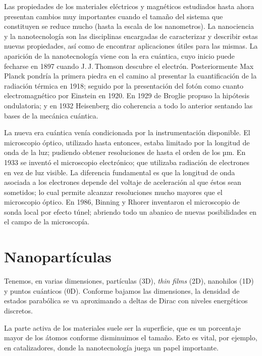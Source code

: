 \documentclass{tufte-book}
\begin{document}
Las propiedades de los materiales eléctricos y magnéticos estudiados
hasta ahora presentan cambios muy importantes cuando el tamaño del
sistema que constituyen se reduce mucho (hasta la escala de los
nanometros). La nanociencia y la nanotecnología son las disciplinas
encargadas de caracterizar y describir estas nuevas propiedades, así
como de encontrar aplicaciones útiles para las mismas. La aparición de
la nanotecnología viene con la era cuántica, cuyo inicio puede
fecharse en 1897 cuando J.\,J.\,Thomson descubre el electrón.
Posteriormente Max Planck pondría la primera piedra en el camino al
presentar la cuantificación de la radiación térmica en 1918; seguido
por la presentación del fotón como cuanto electromagnético por
Einstein en 1920. En 1929 de Broglie propuso la hipótesis ondulatoria;
y en 1932 Heisenberg dio coherencia a todo lo anterior sentando las
bases de la mecánica cuántica.

La nueva era cuántica venía condicionada por la instrumentación
disponible. El microscopio óptico, utilizado hasta entonces, estaba
limitado por la longitud de onda de la luz; pudiendo obtener
resoluciones de hasta el orden de los µm. En 1933 se inventó el
microscopio electrónico; que utilizaba radiación de electrones en vez
de luz visible. La diferencia fundamental es que la longitud de onda
asociada a los electrones depende del voltaje de aceleración al que
éstos sean sometidos; lo cual permite alcanzar resoluciones mucho
mayores que el microscopio óptico. En 1986, Binning y Rhorer
inventaron el microscopio de sonda local por efecto túnel; abriendo
todo un abanico de nuevas posibilidades en el campo de la microscopía.

\section{Nanopartículas}

Tenemos, en varias dimensiones, partículas (3D), \textit{thin films}
(2D), nanohilos (1D) y puntos cuánticos (0D). Conforme bajamos las
dimensiones, la densidad de estados parabólica se va aproximando a
deltas de Dirac con niveles energéticos discretos.

La parte activa de los materiales suele ser la superficie, que es un
porcentaje mayor de los átomos conforme disminuimos el tamaño. Esto es
vital, por ejemplo, en catalizadores, donde la nanotecnología juega un
papel importante.
\end{document}
